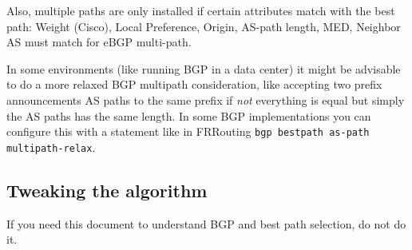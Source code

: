 Also, multiple paths are only installed if certain attributes match with the best path: Weight (Cisco), Local Preference, Origin, AS-path length, MED, Neighbor AS must match for eBGP multi-path.

In some environments (like running BGP in a data center) it might be advisable to do a more relaxed BGP multipath consideration, like accepting two prefix announcements AS paths to the same prefix if \emph{not} everything is equal but simply the AS paths has the same length. In some BGP implementations you can configure this with a statement like in FRRouting \texttt{bgp bestpath as-path multipath-relax}.

\subsection{Tweaking the algorithm}
If you need this document to understand BGP and best path selection, do not do it.
